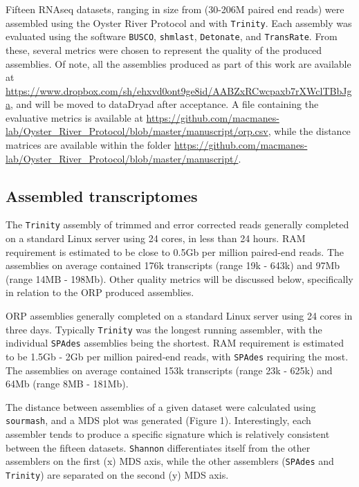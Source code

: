 \documentclass[10pt,letterpaper]{article}
\begin{document}
Fifteen RNAseq datasets, ranging in size from (30-206M paired end reads) were assembled using the Oyster River Protocol and with \texttt{Trinity}. Each assembly was evaluated using the software \texttt{BUSCO}, \texttt{shmlast}, \texttt{Detonate}, and \texttt{TransRate}. From these, several metrics were chosen to represent the quality of the produced assemblies. Of note, all the assemblies produced as part of this work are available at \url{https://www.dropbox.com/sh/ehxvd0ont9ge8id/AABZxRCwcpaxb7rXWclTBbJga}, and will be moved to dataDryad after acceptance. A file containing the evaluative metrics is available at \url{https://github.com/macmanes-lab/Oyster_River_Protocol/blob/master/manuscript/orp.csv}, while the distance matrices are available within the folder \url{https://github.com/macmanes-lab/Oyster_River_Protocol/blob/master/manuscript/}. 

\subsection{Assembled transcriptomes} 

The \texttt{Trinity} assembly of trimmed and error corrected reads generally completed on a standard Linux server using 24 cores, in less than 24 hours. RAM requirement is estimated to be close to 0.5Gb per million paired-end reads. The assemblies on average contained 176k transcripts (range 19k - 643k) and 97Mb (range 14MB - 198Mb). Other quality metrics will be discussed below, specifically in relation to the ORP produced assemblies.  

ORP assemblies generally completed on a standard Linux server using 24 cores in three days. Typically \texttt{Trinity} was the longest running assembler, with the individual \texttt{SPAdes} assemblies being the shortest. RAM requirement is estimated to be 1.5Gb - 2Gb per million paired-end reads, with \texttt{SPAdes} requiring the most. The assemblies on average contained 153k transcripts (range 23k - 625k) and 64Mb (range 8MB - 181Mb).

The distance between assemblies of a given dataset were calculated using \texttt{sourmash}, and a MDS plot was generated (Figure 1). Interestingly, each assembler tends to produce a specific signature which is relatively consistent between the fifteen datasets. \texttt{Shannon} differentiates itself from the other assemblers on the first (x) MDS axis, while the other assemblers (\texttt{SPAdes} and \texttt{Trinity}) are separated on the second (y) MDS axis. 
\end{document}

